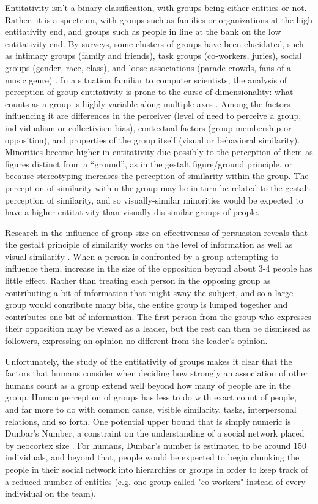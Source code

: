 Entitativity isn't a binary classification, with groups being either entities or not. 
Rather, it is a spectrum, with groups such as families or organizations at the high entitativity end, and groups such as people in line at the bank on the low entitativity end. 
By surveys, some clusters of groups have been elucidated, such as intimacy groups (family and friends), task groups (co-workers, juries), social groups (gender, race, class), and loose associations (parade crowds, fans of a music genre) \citep{lickel2001elements}. 
In a situation familiar to computer scientists, the analysis of perception of group entitativity is prone to the curse of dimensionality: what counts as a group is highly variable along multiple axes \citep{lickel2000varieties}.  
Among the factors influencing it are differences in the perceiver (level of need to perceive a group, individualism or collectivism bias), contextual factors (group membership or opposition), and properties of the group itself (visual or behavioral similarity).
Minorities become higher in entitativity due possibly to the perception of them as figures distinct from a ``ground'', as in the gestalt figure/ground principle, or because stereotyping increases the perception of similarity within the group. 
The perception of similarity within the group may be in turn be related to the gestalt perception of similarity, and so visually-similar minorities would be expected to have a higher entitativity than visually dis-similar groups of people. 
	
Research in the influence of group size on effectiveness of persuasion reveals that the gestalt principle of similarity works on the level of information as well as visual similarity \cite{wilder1977perception}. 
When a person is confronted by a group attempting to influence them, increase in the size of the opposition beyond about 3-4 people has little effect. 
Rather than treating each person in the opposing group as contributing a bit of information that might sway the subject, and so a large group would contribute many bits, the entire group is lumped together and contributes one bit of information. 
The first person from the group who expresses their opposition may be viewed as a leader, but the rest can then be dismissed as followers, expressing an opinion no different from the leader's opinion. 

Unfortunately, the study of the entitativity of groups makes it clear that the factors that humans consider when deciding how strongly an association of other humans count as a group extend well beyond how many of people are in the group.
Human perception of groups has less to do with exact count of people, and far more to do with common cause, visible similarity, tasks, interpersonal relations, and so forth. 
One potential upper bound that is simply numeric is Dunbar's Number, a constraint on the understanding of a social network placed by neocortex size \citep{dunbar1992neocortex}. 
For humans, Dunbar's number is estimated to be around 150 individuals, and beyond that, people would be expected to begin chunking the people in their social network into hierarchies or groups in order to keep track of a reduced number of entities (e.g. one group called "co-workers" instead of every individual on the team). 

